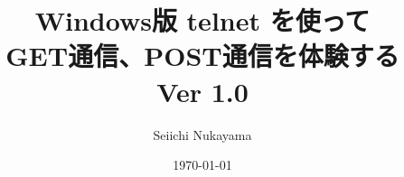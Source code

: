 \title{Windows版 telnet を使って \\ GET通信、POST通信を体験する \\ Ver 1.0}
\author{Seiichi Nukayama}
\date{\today}

